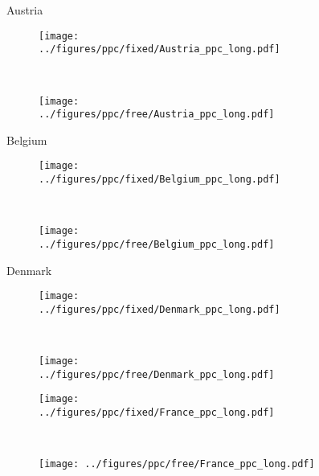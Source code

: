 \documentclass[12pt]{extarticle}
\begin{document}
\begin{figure*}[h]	
    \centering
	\caption*{Austria}
    \begin{subfigure}{0.45\textwidth}
        \texttt{[image: ../figures/ppc/fixed/Austria\_ppc\_long.pdf]}
    \end{subfigure}
    ~
    \begin{subfigure}{0.45\textwidth}
        \texttt{[image: ../figures/ppc/free/Austria\_ppc\_long.pdf]}
    \end{subfigure}
	\caption*{Belgium}    
    \begin{subfigure}{0.45\textwidth}
        \texttt{[image: ../figures/ppc/fixed/Belgium\_ppc\_long.pdf]}
    \end{subfigure}
    ~
    \begin{subfigure}{0.45\textwidth}
        \texttt{[image: ../figures/ppc/free/Belgium\_ppc\_long.pdf]}
    \end{subfigure}
	\caption*{Denmark}    
     \begin{subfigure}{0.45\textwidth}
        \texttt{[image: ../figures/ppc/fixed/Denmark\_ppc\_long.pdf]}
    \end{subfigure}
    ~
    \begin{subfigure}{0.45\textwidth}
        \texttt{[image: ../figures/ppc/free/Denmark\_ppc\_long.pdf]}
    \end{subfigure}
	\caption*{France}    
    \begin{subfigure}{0.45\textwidth}
        \texttt{[image: ../figures/ppc/fixed/France\_ppc\_long.pdf]}
    \end{subfigure}
    ~
    \begin{subfigure}{0.45\textwidth}
        \texttt{[image: ../figures/ppc/free/France\_ppc\_long.pdf]}
    \end{subfigure}
\end{figure*}
\end{document}
